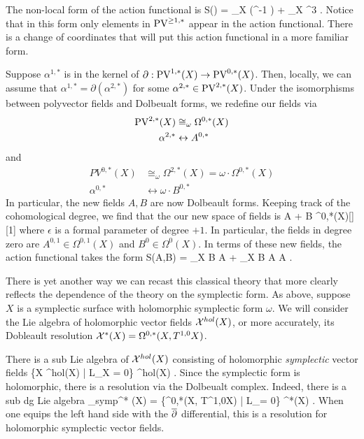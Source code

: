\documentclass[10pt]{amsart}
\def\PV{{\rm PV}}
\begin{document}
The non-local form of the action functional is
\ben
S(\alpha) =  \int_X \alpha \dbar (\partial^{-1} \alpha) +  \int_X \alpha^3 .
\een
Notice that in this form only elements in $\PV^{\geq 1, *}$ appear in the action functional.
There is a change of coordinates that will put this action functional in a more familiar form.

Suppose $\alpha^{1,*}$ is in the kernel of $\partial : \PV^{1,*} (X) \to \PV^{0,*}(X)$.
Then, locally, we can assume that $\alpha^{1,*} = \partial (\alpha^{2,*})$ for some $\alpha^{2,*} \in \PV^{2,*}(X)$.
Under the isomorphisms between polyvector fields and Dolbeualt forms, we redefine our fields via
\begin{align*}
\PV^{2,*}(X) & \cong_\omega \Omega^{0,*}(X)\\
\alpha^{2,*} & \leftrightarrow A^{0,*} 
\end{align*}
and
\begin{align*}
PV^{0,*}(X) & \cong_\omega \Omega^{2,*}(X) = \omega \cdot \Omega^{0,*}(X) \\
\alpha^{0,*} & \leftrightarrow \omega \cdot B^{0,*}
\end{align*}
In particular, the new fields $A,B$ are now Dolbeault forms. 
Keeping track of the cohomological degree, we find that the our new space of fields is
\ben
A + \epsilon B \in \Omega^{0,*}(X)[\epsilon][1]
\een
where $\epsilon$ is a formal parameter of degree $+1$.
In particular, the fields in degree zero are $A^{0,1} \in \Omega^{0,1}(X)$ and $B^0 \in \Omega^0(X)$. 
In terms of these new fields, the action functional takes the form
\be\label{action2}
S(A,B) = \int_X \omega B \dbar A +  \int_X B \partial A \partial A .
\ee

There is yet another way we can recast this classical theory that more clearly reflects the dependence of the theory on the symplectic form. 
As above, suppose $X$ is a symplectic surface with holomorphic symplectic form $\omega$. 
We will consider the Lie algebra of holomorphic vector fields $\mathcal X^{hol}(X)$, or more accurately, its Dobleault resolution $\mathcal X^{*} (X) = \Omega^{0,*}(X, T^{1,0}X)$.

There is a sub Lie algebra of $\mathcal X^{hol}(X)$ consisting of holomorphic {\em symplectic} vector fields
\ben
\{X \in \cX^{hol}(X) \; | \; L_X \omega = 0\} \subset \cX^{hol}(X) .
\een
Since the symplectic form is holomorphic, there is a resolution via the Dolbeualt complex.
Indeed, there is a sub dg Lie algebra 
\ben
\cX_{symp}^* (X) = \{\xi \in \Omega^{0,*}(X, T^{1,0}X) \; | \; L_\xi \omega = 0\} \subset \cX^*(X) .
\een
When one equips the left hand side with the $\overline{\partial}$ differential, this is a resolution for holomorphic symplectic vector fields. 
\end{document}
